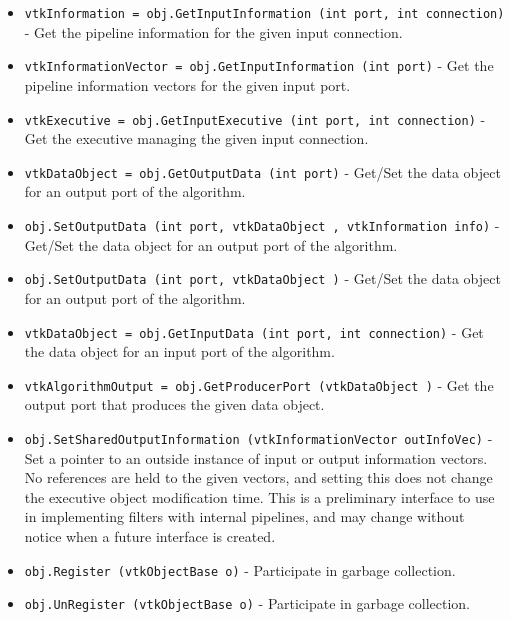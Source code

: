 \begin{itemize}
\item  \verb|vtkInformation = obj.GetInputInformation (int port, int connection)| -  Get the pipeline information for the given input connection.

\item  \verb|vtkInformationVector = obj.GetInputInformation (int port)| -  Get the pipeline information vectors for the given input port.

\item  \verb|vtkExecutive = obj.GetInputExecutive (int port, int connection)| -  Get the executive managing the given input connection.

\item  \verb|vtkDataObject = obj.GetOutputData (int port)| -  Get/Set the data object for an output port of the algorithm.

\item  \verb|obj.SetOutputData (int port, vtkDataObject , vtkInformation info)| -  Get/Set the data object for an output port of the algorithm.

\item  \verb|obj.SetOutputData (int port, vtkDataObject )| -  Get/Set the data object for an output port of the algorithm.

\item  \verb|vtkDataObject = obj.GetInputData (int port, int connection)| -  Get the data object for an input port of the algorithm.

\item  \verb|vtkAlgorithmOutput = obj.GetProducerPort (vtkDataObject )| -  Get the output port that produces the given data object.

\item  \verb|obj.SetSharedOutputInformation (vtkInformationVector outInfoVec)| -  Set a pointer to an outside instance of input or output
 information vectors.  No references are held to the given
 vectors, and setting this does not change the executive object
 modification time.  This is a preliminary interface to use in
 implementing filters with internal pipelines, and may change
 without notice when a future interface is created.

\item  \verb|obj.Register (vtkObjectBase o)| -  Participate in garbage collection.

\item  \verb|obj.UnRegister (vtkObjectBase o)| -  Participate in garbage collection.

\end{itemize}
